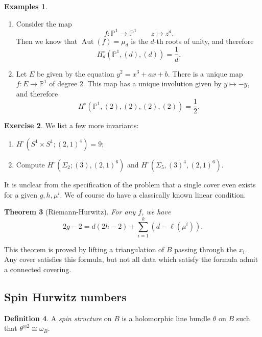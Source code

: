 \documentclass[leqno, openany]{memoir}
\newtheorem{thm}{Theorem}[section]
\theoremstyle{definition}
\newtheorem{defn}[thm]{Definition}
\newtheorem{exms}[thm]{Examples}
\newtheorem{exer}[thm]{Exercise}
\theoremstyle{remark}
\theoremstyle{plain}
\theoremstyle{definition}
\theoremstyle{remark}
\renewcommand{\P}{\mathbb{P}}
\DeclareMathOperator{\Aut}{Aut}
\begin{document}
\begin{exms}\leavevmode
  \begin{enumerate}
  \item Consider the map
  \[ f \colon \P^1 \to \P^1 \qquad z \mapsto z^d. \]
  Then we know that $\Aut(f) = \mu_d$ is the $d$-th roots of unity, and therefore
  \[ H_d^{\circ} (\P^1, (d), (d)) = \frac{1}{d}. \]
  \item Let $E$ be given by the equation $y^2 = x^3 + ax+b$. There is a unique map $f \colon E \to \P^1$ of degree $2$. This map has a unique involution given by $y \mapsto -y$, and therefore
  \[ H^{\circ}(\P^1, (2), (2), (2), (2)) = \frac{1}{2}. \]
  \end{enumerate}
\end{exms}

\begin{exer}
  We list a few more invariants:
  \begin{enumerate}
  \item $H^{\circ}(S^1 \times S^1; (2,1)^4) = 9$;
    \item Compute $H^{\circ}(\Sigma_2; (3), (2,1)^6)$ and $H^{\circ}(\Sigma_5, (3)^4, (2,1)^6)$.
  \end{enumerate}
\end{exer}

It is unclear from the specification of the problem that a single cover even exists for a given $g, h, \mu^i$. We of course do have a classically known linear condition.

\begin{thm}[Riemann-Hurwitz]
  For any $f$, we have
  \[ 2g-2 = d(2h-2) + \sum_{i=1}^k (d-\ell(\mu^i)). \]
\end{thm}

This theorem is proved by lifting a triangulation of $B$ passing through the $x_i$. Any cover satisfies this formula, but not all data which satisfy the formula admit a connected covering.

\subsection{Spin Hurwitz numbers}
\label{subsec:spin}

\begin{defn}
A \textit{spin structure} on $B$ is a holomorphic line bundle $\theta$ on $B$ such that $\theta^{\otimes 2} \cong \omega_B$.
\end{defn}
\end{document}
